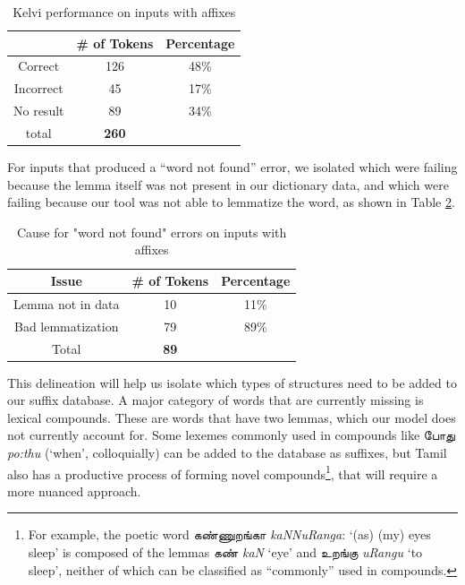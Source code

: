 \documentclass[11pt]{article}
\begin{document}
\begin{table}[ht]
  \center
  \begin{tabular}{c|c|c}
     & \# of Tokens & Percentage\\
    \hline
    Correct & 126 & 48\% \\
    Incorrect & 45 & 17\% \\
    No result & 89 & 34\% \\
    \hline
    total & \textbf{260} & \\
  \end{tabular}
  \caption{Kelvi performance on inputs with affixes}
  \label{tab:conjugated}
\end{table}
For inputs that produced a “word not found” error, we isolated which were 
failing because the lemma itself was not present in our dictionary data, 
and which were failing because our tool was not able to lemmatize the word, 
as shown in Table \ref{tab:no-result}.
\begin{table}[ht]
  \center
  \begin{tabular}{c|c|c}
    Issue & \# of Tokens & Percentage\\
    \hline
    Lemma not in data & 10 & 11\% \\
    Bad lemmatization & 79 & 89\% \\
    \hline
    Total & \textbf{89} & \\
  \end{tabular}
  \caption{Cause for "word not found" errors on inputs with affixes}
  \label{tab:no-result}
  \vspace{-4em}
\end{table}
This delineation will help us isolate which types of 
structures need to be added to our suffix database. 
A major category of words that are currently missing is lexical compounds. 
These are words that have two lemmas, which our model does not currently account for. 
Some lexemes commonly used in compounds like \foreignlanguage{tamil}{போது} \textit{po:thu} (‘when’, colloquially) 
can be added to the database as suffixes, but Tamil also has a 
productive process of forming novel compounds\footnote{For example, the poetic word \foreignlanguage{tamil}{கண்ணுறங்கா} \textit{kaNNuRanga}: ‘(as) (my) eyes sleep’ is composed of the lemmas \foreignlanguage{tamil}{கண்} \textit{kaN} ‘eye’ and \foreignlanguage{tamil}{உறங்கு} \textit{uRangu} ‘to sleep’, neither of which can be classified as “commonly” used in compounds.}, that will require a more nuanced approach.
\end{document}
